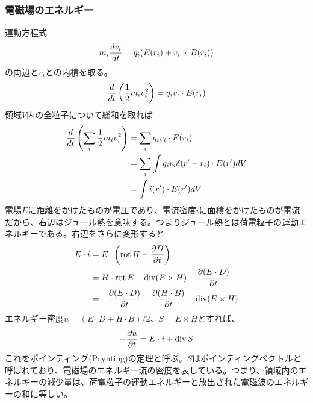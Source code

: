     \subsubsection{電磁場のエネルギー}
        運動方程式
            \[m_i\de[v_i]{t} = q_i(E(r_i) + v_i \times B(r_i))\]
        の両辺と$v_i$との内積を取る。
            \[\de{t}\left(\frac{1}{2}m_iv_i^2\right) = q_iv_i \cdot E(r_i)\]
        領域$V$内の全粒子について総和を取れば
        \begin{align*}
            \de{t}\left(\sum_i \frac{1}{2}m_iv_i^2\right)
                &= \sum_i q_iv_i \cdot E(r_i)\\
                &= \sum_i \int q_iv_i\delta(r' - r_i) \cdot E(r') dV\\
                &= \int i(r') \cdot E(r') dV
        \end{align*}
        電場$E$に距離をかけたものが電圧であり、電流密度$i$に面積をかけたものが電流だから、右辺はジュール熱を意味する。つまりジュール熱とは荷電粒子の運動エネルギーである。右辺をさらに変形すると
        \begin{align*}
            E \cdot i
                &= E \cdot \left(\rot H - \pd[D]{t}\right)\\
                &= H \cdot \rot E - \div(E \times H) - \pd[(E \cdot D)]{t}\\
                &= -\pd[(E \cdot D)]{t} - \pd[(H \cdot B)]{t} - \div(E \times H)
        \end{align*}
        エネルギー密度$u = (E \cdot D + H \cdot B) / 2$、$S = E \times H$とすれば、
            \[-\pd[u]{t} = E \cdot i + \div S\]
        これをポインティング(Poynting)の定理と呼ぶ。$S$はポインティングベクトルと呼ばれており、電磁場のエネルギー流の密度を表している。つまり、領域内のエネルギーの減少量は、荷電粒子の運動エネルギーと放出された電磁波のエネルギーの和に等しい。

